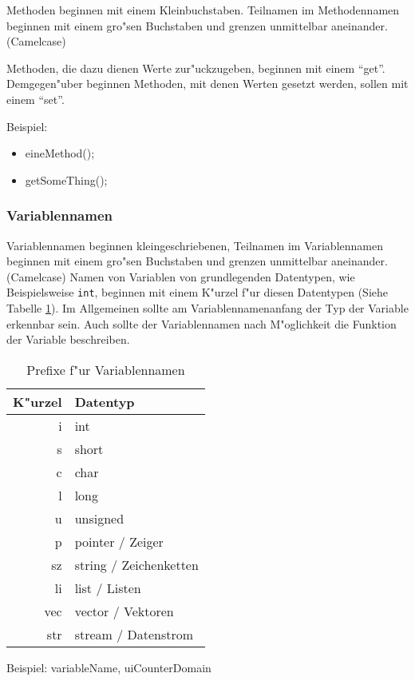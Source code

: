 Methoden beginnen mit einem Kleinbuchstaben. Teilnamen im Methodennamen beginnen mit einem gro"sen Buchstaben und grenzen unmittelbar aneinander. (Camelcase)

Methoden, die dazu dienen Werte zur"uckzugeben, beginnen mit einem "`get"'. Demgegen"uber beginnen Methoden, mit denen Werten gesetzt werden, sollen mit einem "`set"'.

\noindent
Beispiel:
\begin{itemize}
 \item eineMethod();
 \item getSomeThing();
\end{itemize}


\subsubsection{Variablennamen}

Variablennamen beginnen kleingeschriebenen, Teilnamen im Variablennamen beginnen mit einem gro"sen Buchstaben und grenzen unmittelbar aneinander. (Camelcase) Namen von Variablen von grundlegenden Datentypen, wie Beispielsweise \texttt{int}, beginnen mit einem K"urzel f"ur diesen Datentypen (Siehe Tabelle \ref{tabDatatypsPrefixe}). Im Allgemeinen sollte am Variablennamenanfang der Typ der Variable erkennbar sein. Auch sollte der Variablennamen nach M"oglichkeit die Funktion der Variable beschreiben.

\begin{table}
	\centering
		\begin{tabular}{r|l}\hline
			K"urzel & Datentyp\\\hline
			i & int\\
			s & short\\
			c & char\\
			l & long\\
			u & unsigned\\
			p & pointer / Zeiger\\
			sz  & string / Zeichenketten\\
			li  & list / Listen\\
			vec & vector / Vektoren\\
			str & stream / Datenstrom\\
		\end{tabular}
\caption{Prefixe f"ur Variablennamen}
\label{tabDatatypsPrefixe}
\end{table}

\noindent
Beispiel: variableName, uiCounterDomain






